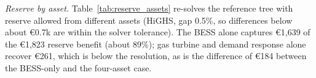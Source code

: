 \documentclass[5p,times,twocolumn]{elsarticle}
\begin{document}
\textit{Reserve by asset.} Table~\ref{tab:reserve_assets} re-solves the reference tree with reserve allowed from different assets (HiGHS, gap 0.5\%, so differences below about \euro 0.7k are within the solver tolerance). The BESS alone captures \euro 1,639 of the \euro 1,823 reserve benefit (about 89\%); gas turbine and demand response alone recover \euro 261, which is below the resolution, as is the difference of \euro 184 between the BESS-only and the four-asset case.

\begin{table}[t]
\caption{expected net operating cost by reserve source (EUR, reference tree, Stage-1 reserve, real spinning reserve prices).}
\label{tab:reserve_assets}
\centering
\scriptsize
{}
\end{table}
\end{document}
